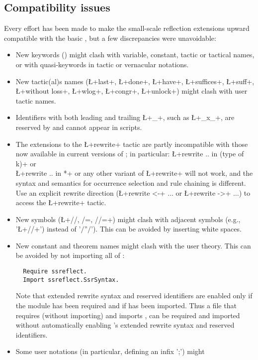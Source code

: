 \subsection{Compatibility issues}\label{sec:compat}
Every effort has been made to make the small-scale reflection
extensions upward compatible with the basic \Coq{}, but a few
discrepancies were unavoidable:
\begin{itemize}
\item New keywords () might clash with variable, constant,
tactic or tactical names, or with quasi-keywords in tactic or
vernacular notations.
\item New tactic(al)s names (\L+last+, \L+done+, \L+have+,
  \L+suffices+, \L+suff+,
  \L+without loss+, \L+wlog+, \L+congr+, \L+unlock+) might clash
  with user tactic names.
\item Identifiers with both leading and trailing \L+_+, such as \L+_x_+,
are reserved by \ssr{} and cannot appear in scripts.
\item The extensions to the \L+rewrite+ tactic are partly
incompatible with those now available in current versions of \Coq{};
in particular:
\L+rewrite .. in (type of k)+ or \\ \L+rewrite .. in *+ or any other
variant of \L+rewrite+ will not work, and the \ssr{} syntax and semantics for occurrence selection and
rule chaining is different.
Use an explicit rewrite direction (\L+rewrite <-+ $\dots$ or \L+rewrite ->+ $\dots$)
to access the \Coq{} \L+rewrite+ tactic.
\item New symbols (\L+//, /=, //=+) might clash with adjacent symbols
(e.g., '\L+//+') instead of '$/$''$/$'). This can be avoided by
inserting white spaces.
\item New constant and theorem names might clash with the user
theory. This can be avoided by not importing all of \ssr{}:
\begin{lstlisting}
  Require ssreflect.
  Import ssreflect.SsrSyntax.
\end{lstlisting}
Note that \ssr{} extended rewrite syntax and reserved identifiers are
enabled only if the  module has been required and if
 has been imported. Thus a file that requires (without importing)
  and imports , can be
required and imported without automatically enabling \ssr{}'s
extended rewrite syntax and reserved identifiers.
\item Some user notations (in particular, defining an infix ';') might

\end{itemize}
